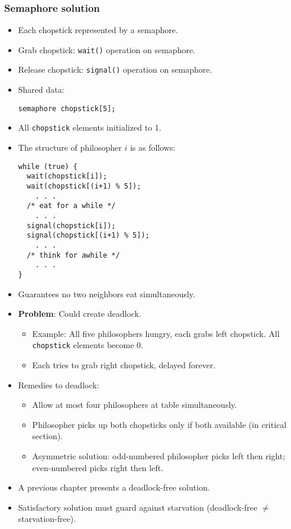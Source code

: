 \begin{itemize}
    \subsubsection{Semaphore solution}
    \begin{itemize}
        \item Each chopstick represented by a semaphore.
        \item Grab chopstick: \texttt{wait()} operation on semaphore.
        \item Release chopstick: \texttt{signal()} operation on semaphore.
        \item Shared data:
        \begin{verbatim}
semaphore chopstick[5];
\end{verbatim}
        \item All \texttt{chopstick} elements initialized to 1.
        \item The structure of philosopher $i$ is as follows:
        \begin{verbatim}
while (true) {
  wait(chopstick[i]);
  wait(chopstick[(i+1) % 5]);
    . . .
  /* eat for a while */
    . . .
  signal(chopstick[i]);
  signal(chopstick[(i+1) % 5]);
    . . .
  /* think for awhile */
    . . .
}
        \end{verbatim}
        \item Guarantees no two neighbors eat simultaneously.
        \item \textbf{Problem}: Could create deadlock.
        \begin{itemize}
            \item Example: All five philosophers hungry, each grabs left chopstick. All \texttt{chopstick} elements become 0.
            \item Each tries to grab right chopstick, delayed forever.
        \end{itemize}
        \item Remedies to deadlock:
        \begin{itemize}
            \item Allow at most four philosophers at table simultaneously.
            \item Philosopher picks up both chopsticks only if both available (in critical section).
            \item Asymmetric solution: odd-numbered philosopher picks left then right; even-numbered picks right then left.
        \end{itemize}
        \item A previous chapter presents a deadlock-free solution.
        \item Satisfactory solution must guard against starvation (deadlock-free $\neq$ starvation-free).
    \end{itemize}


\end{itemize}
